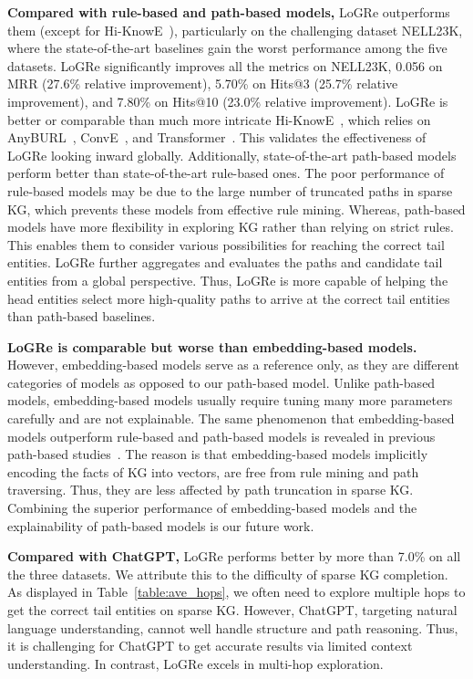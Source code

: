 \documentclass[sigconf]{acmart}
\begin{document}
\textbf{Compared with rule-based and path-based models,} LoGRe outperforms them (except for Hi-KnowE~\cite{Hi-KnowE}), particularly on the challenging dataset NELL23K, where the state-of-the-art baselines gain the worst performance among the five datasets. LoGRe significantly improves all the metrics on NELL23K, 0.056 on MRR (27.6\% relative improvement), 5.70\% on Hits@3 (25.7\% relative improvement), and 7.80\% on Hits@10 (23.0\% relative improvement). LoGRe is better or comparable than much more intricate Hi-KnowE~\cite{Hi-KnowE}, which relies on AnyBURL~\cite{AnyBURL}, ConvE~\cite{ConvE}, and Transformer~\cite{Transformer}. This validates the effectiveness of LoGRe looking inward globally. Additionally, state-of-the-art path-based models perform better than state-of-the-art rule-based ones. The poor performance of rule-based models may be due to the large number of truncated paths in sparse KG, which prevents these models from effective rule mining. Whereas, path-based models have more flexibility in exploring KG rather than relying on strict rules. This enables them to consider various possibilities for reaching the correct tail entities. LoGRe further aggregates and evaluates the paths and candidate tail entities from a global perspective. Thus, LoGRe is more capable of helping the head entities select more high-quality paths to arrive at the correct tail entities than path-based baselines.

\textbf{LoGRe is comparable but worse than embedding-based models.} However, embedding-based models serve as a reference only, as they are different categories of models as opposed to our path-based model. Unlike path-based models, embedding-based models usually require tuning many more parameters carefully and are not explainable. The same phenomenon that embedding-based models outperform rule-based and path-based models is revealed in previous path-based studies~\cite{DacKGR,SparKGR}. The reason is that embedding-based models implicitly encoding the facts of KG into vectors, are free from rule mining and path traversing. Thus, they are less affected by path truncation in sparse KG. Combining the superior performance of embedding-based models and the explainability of path-based models is our future work.

\textbf{Compared with ChatGPT,} LoGRe performs better by more than 7.0\% on all the three datasets. We attribute this to the difficulty of sparse KG completion. As displayed in Table~\ref{table:ave_hops}, we often need to explore multiple hops to get the correct tail entities on sparse KG. However, ChatGPT, targeting natural language understanding, cannot well handle structure and path reasoning. Thus, it is challenging for ChatGPT to get accurate results via limited context understanding. In contrast, LoGRe excels in multi-hop exploration. 
\end{document}
